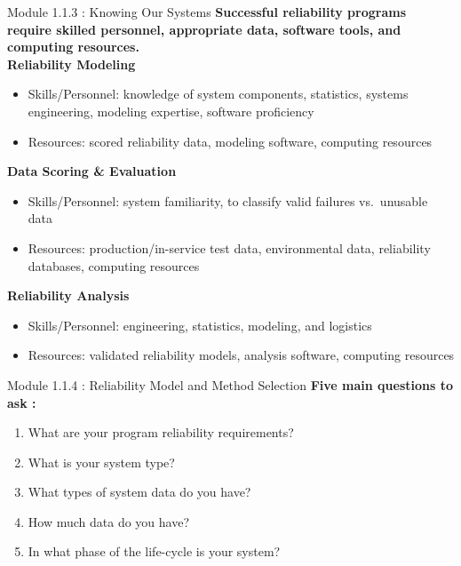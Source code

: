 \documentclass{beamer}
\begin{document}
\begin{frame}{Module 1.1.3 : Knowing Our Systems}
\small
\textbf{Successful reliability programs require skilled personnel, appropriate data, software tools, and computing resources.} \\ \vspace{0.25cm}
\scriptsize
\textbf{Reliability Modeling}
\begin{itemize}
\scriptsize
\item Skills/Personnel: knowledge of system components, statistics, systems engineering, modeling expertise, software proficiency
\item Resources: scored reliability data, modeling software, computing resources
\end{itemize}
\textbf{Data Scoring \& Evaluation}
\scriptsize
\begin{itemize}
\item Skills/Personnel: system familiarity, to classify valid failures vs.\ unusable data
\item Resources: production/in-service test data, environmental data, reliability databases, computing resources
\end{itemize}
\textbf{Reliability Analysis}
\begin{itemize}
\item Skills/Personnel: engineering, statistics, modeling, and logistics
\item Resources: validated reliability models, analysis software, computing resources
\end{itemize}
\end{frame}

\begin{frame}{Module 1.1.4 : Reliability Model and Method Selection}
\textbf{Five main questions to ask : }
\begin{enumerate}
    \item What are your program reliability requirements?
    \item What is your system type?
    \item What types of system data do you have?
    \item How much data do you have?
    \item In what phase of the life-cycle is your system?
\end{enumerate}
\end{frame}
\end{document}
